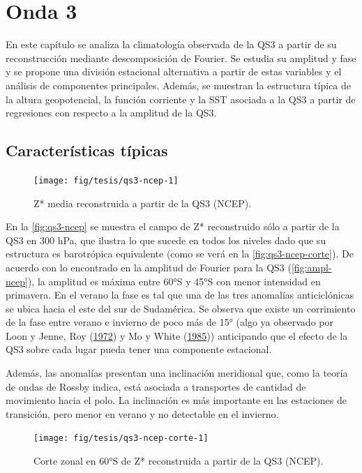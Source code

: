 \documentclass[spanish,a4paper,12pt,oneside]{book}
\begin{document}
\chapter{Onda 3}\label{onda-3}

En este capítulo se analiza la climatología observada de la QS3 a partir
de su reconstrucción mediante descomposición de Fourier. Se estudia su
amplitud y fase y se propone una división estacional alternativa a
partir de estas variables y el análisis de componentes principales.
Además, se muestran la estructura típica de la altura geopotencial, la
función corriente y la SST asociada a la QS3 a partir de regresiones con
respecto a la amplitud de la QS3.

\section{Características típicas}\label{caracteristicas-tipicas}

\begin{figure}
\texttt{[image: fig/tesis/qs3-ncep-1]} \caption{Z* media reconstruida a partir de la QS3 (NCEP).}\label{fig:qs3-ncep}
\end{figure}

En la \autoref{fig:qs3-ncep} se muestra el campo de Z* reconstruido sólo
a partir de la QS3 en 300 hPa, que ilustra lo que sucede en todos los
niveles dado que su estructura es barotrópica equivalente (como se verá
en la \autoref{fig:qs3-ncep-corte}). De acuerdo con lo encontrado en la
amplitud de Fourier para la QS3 (\autoref{fig:ampl-ncep}), la amplitud
es máxima entre 60°S y 45°S con menor intensidad en primavera. En el
verano la fase es tal que una de las tres anomalías anticiclónicas se
ubica hacia el este del sur de Sudamérica. Se observa que existe un
corrimiento de la fase entre verano e invierno de poco más de 15° (algo
ya observado por Loon y Jenne, Roy
(\protect\hyperlink{ref-Loon1972}{1972}) y Mo y White
(\protect\hyperlink{ref-Mo1985}{1985})) anticipando que el efecto de la
QS3 sobre cada lugar pueda tener una componente estacional.

Además, las anomalías presentan una inclinación meridional que, como la
teoría de ondas de Rossby indica, está asociada a transportes de
cantidad de movimiento hacia el polo. La inclinación es más importante
en las estaciones de transición, pero menor en verano y no detectable en
el invierno.

\begin{figure}
\texttt{[image: fig/tesis/qs3-ncep-corte-1]} \caption{Corte zonal en 60°S de Z* reconstruida a partir de la QS3 (NCEP).}\label{fig:qs3-ncep-corte}
\end{figure}
\end{document}
